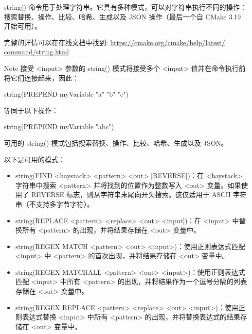 

string() 命令用于处理字符串。它具有多种模式，可以对字符串执行不同的操作：搜索替换、操作、比较、哈希、生成以及 JSON 操作（最后一个自 CMake 3.19 开始可用）。

完整的详情可以在在线文档中找到: \url{https://cmake.org/cmake/help/latest/ command/string.html}

\begin{myNotic}{Note}
接受 <input> 参数的 string() 模式将接受多个 <input> 值并在命令执行前将它们连接起来，因此：

\begin{cmake}
string(PREPEND myVariable "a" "b" "c")
\end{cmake}

等同于以下操作：

\begin{cmake}
string(PREPEND myVariable "abc")
\end{cmake}
\end{myNotic}

可用的 string() 模式包括搜索替换、操作、比较、哈希、生成以及 JSON。


以下是可用的模式：

\begin{itemize}
\item
string(FIND <haystack> <pattern> <out> [REVERSE])：在 <haystack> 字符串中搜索 <pattern> 并将找到的位置作为整数写入 <out> 变量。如果使用了 REVERSE 标志，则从字符串末尾向开头搜索。这仅适用于 ASCII 字符串（不支持多字节字符）。

\item
string(REPLACE <pattern> <replace> <out> <input])：在 <input> 中替换所有 <pattern> 的出现，并将结果存储在 <out> 变量中。

\item
string(REGEX MATCH <pattern> <out> <input>)：使用正则表达式匹配 <input> 中 <pattern> 的首次出现，并将结果存储在 <out> 变量中。

\item
string(REGEX MATCHALL <pattern> <out> <input>)：使用正则表达式匹配 <input> 中所有 <pattern> 的出现，并将结果作为一个逗号分隔的列表存储在 <out> 变量中。

\item
string(REGEX REPLACE <pattern> <replace> <out> <input>)：使用正则表达式替换 <input> 中所有 <pattern> 的出现，并将替换表达式的结果存储在 <out> 变量中。
\end{itemize}

